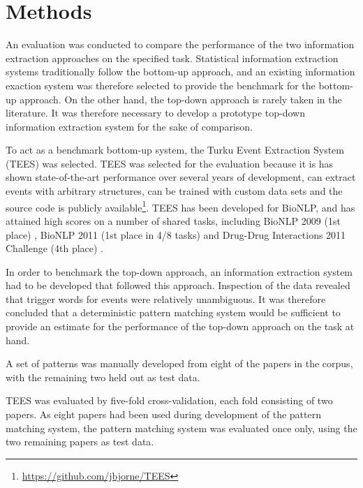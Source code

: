 \section{Methods}

An evaluation was conducted to compare the performance of the two information extraction approaches on the specified task. Statistical information extraction systems traditionally follow the bottom-up approach, and an existing information exaction system was therefore selected to provide the benchmark for the bottom-up approach. On the other hand, the top-down approach is rarely taken in the literature. It was therefore necessary to develop a prototype top-down information extraction system for the sake of comparison.

To act as a benchmark bottom-up system, the Turku Event Extraction System (TEES) \citep{bjö11ddi} was selected. TEES was selected for the evaluation because it is has shown state-of-the-art performance over several years of development, can extract events with arbitrary structures, can be trained with custom data sets and the source code is publicly available\footnote{\url{https://github.com/jbjorne/TEES}}. TEES has been developed for BioNLP, and has attained high scores on a number of shared tasks, including BioNLP 2009 (1st place) \citep{bjö09}, BioNLP 2011 (1st place in 4/8 tasks) \citep{bjö11} and Drug-Drug Interactions 2011 Challenge (4th place) \citep{bjö11ddi}.


In order to benchmark the top-down approach, an information extraction system had to be developed that followed this approach. Inspection of the data revealed that trigger words for events were relatively unambiguous. It was therefore concluded that a deterministic pattern matching system would be sufficient to provide an estimate for the performance of the top-down approach on the task at hand.

A set of patterns was manually developed from eight of the papers in the corpus, with the remaining two held out as test data. 



TEES was evaluated by five-fold cross-validation, each fold consisting of two papers. As eight papers had been used during development of the pattern matching system, the pattern matching system was evaluated once only, using the two remaining papers as test data.
